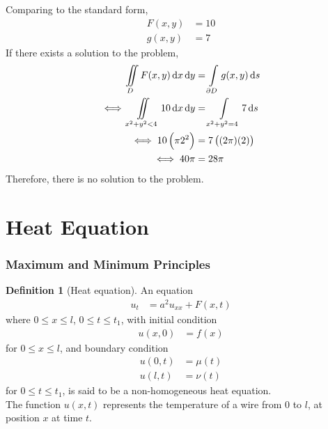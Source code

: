 \documentclass[titlepage, fleqn, a4paper, 12pt, twoside]{article}
\theoremstyle{definition}
\newtheorem{definition}{Definition}
\theoremstyle{theorem}
\begin{document}
\begin{solution}
	Comparing to the standard form,
	\begin{align*}
		F(x,y) & = 10 \\
		g(x,y) & = 7
	\end{align*}
	If there exists a solution to the problem,
	\begin{align*}
		\iint\limits_{D} F(x,y) \dif x \dif y              & = \int\limits_{\partial D} g(x,y) \dif s \\
		\iff \iint\limits_{x^2 + y^2 < 4} 10 \dif x \dif y & = \int\limits_{x^2 + y^2 = 4} 7 \dif s   \\
		\iff 10 \left( \pi 2^2 \right)                     & = 7 \left( (2 \pi) (2) \right)           \\
		\iff 40 \pi                                        & = 28 \pi
	\end{align*}
	Therefore, there is no solution to the problem.
\end{solution}

\clearpage
\part{Heat Equation}

\section{Maximum and Minimum Principles}

\begin{definition}[Heat equation]
	An equation
	\begin{align*}
		u_t & = a^2 u_{x x} + F(x,t)
	\end{align*}
	where $0 \le x \le l$, $0 \le t \le t_1$, with initial condition
	\begin{align*}
		u(x,0) & = f(x)
	\end{align*}
	for $0 \le x \le l$, and boundary condition
	\begin{align*}
		u(0,t) & = \mu(t) \\
		u(l,t) & = \nu(t)
	\end{align*}
	for $0 \le t \le t_1$, is said to be a non-homogeneous heat equation.\\
	The function $u(x,t)$ represents the temperature of a wire from $0$ to $l$, at position $x$ at time $t$.
\end{definition}
\end{document}
